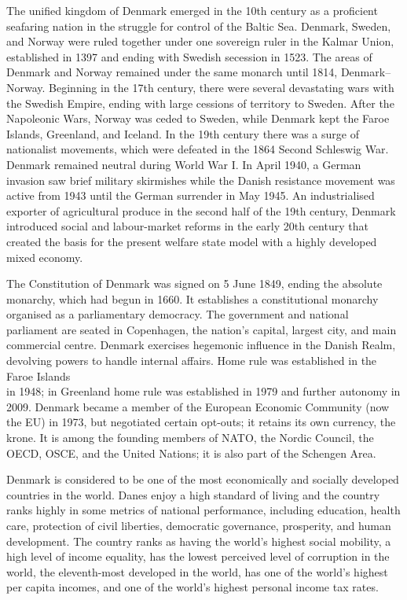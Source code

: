 The unified kingdom of Denmark emerged in the 10th century as a
proficient seafaring nation in the struggle for control of the Baltic
Sea. Denmark, Sweden, and Norway were ruled together under one sovereign
ruler in the Kalmar Union, established in 1397 and ending with Swedish
secession in 1523. The areas of Denmark and Norway remained under the
same monarch until 1814, Denmark--Norway. Beginning in the 17th century,
there were several devastating wars with the Swedish Empire, ending with
large cessions of territory to Sweden. After the Napoleonic Wars, Norway
was ceded to Sweden, while Denmark kept the Faroe Islands, Greenland,
and Iceland. In the 19th century there was a surge of nationalist
movements, which were defeated in the 1864 Second Schleswig War. Denmark
remained neutral during World War I. In April 1940, a German invasion
saw brief military skirmishes while the Danish resistance movement was
active from 1943 until the German surrender in May 1945. An
industrialised exporter of agricultural produce in the second half of
the 19th century, Denmark introduced social and labour-market reforms in
the early 20th century that created the basis for the present welfare
state model with a highly developed mixed economy.

The Constitution of Denmark was signed on 5 June 1849, ending the
absolute monarchy, which had begun in 1660. It establishes a
constitutional monarchy organised as a parliamentary democracy. The
government and national parliament are seated in Copenhagen, the
nation's capital, largest city, and main commercial centre. Denmark
exercises hegemonic influence in the Danish Realm, devolving powers to
handle internal affairs. Home rule was established in the Faroe
Islands\\
in 1948; in Greenland home rule was established in 1979 and further
autonomy in 2009. Denmark became a member of the European Economic
Community (now the EU) in 1973, but negotiated certain opt-outs; it
retains its own currency, the krone. It is among the founding members of
NATO, the Nordic Council, the OECD, OSCE, and the United Nations; it is
also part of the Schengen Area.

Denmark is considered to be one of the most economically and socially
developed countries in the world. Danes enjoy a high standard of living
and the country ranks highly in some metrics of national performance,
including education, health care, protection of civil liberties,
democratic governance, prosperity, and human development. The country
ranks as having the world's highest social mobility, a high level of
income equality, has the lowest perceived level of corruption in the
world, the eleventh-most developed in the world, has one of the world's
highest per capita incomes, and one of the world's highest personal
income tax rates.


